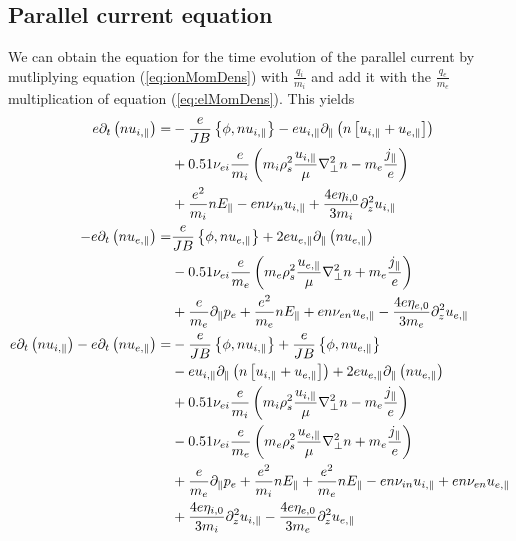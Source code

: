 \subsection{Parallel current equation}
%
We can obtain the equation for the time evolution of the parallel current by
mutliplying equation (\ref{eq:ionMomDens}) with $\frac{q_i}{m_i}$ and add it
with the $\frac{q_e}{m_e}$ multiplication of equation (\ref{eq:elMomDens}).
This yields
%
%
\begin{align*}
 e \partial_t\L( n u_{i,\|}\R)
 =&
 -\frac{e}{JB}\L\{\phi, n u_{i,\|}\R\}
 -e u_{i,\|}\partial_\|\L( n \L[u_{i,\|}+ u_{e,\|} \R]\R)
   \\&
 + 0.51 \nu_{ei}\frac{e}{m_i}\L(
   m_i \rho_s^2\frac{u_{i,\|}}{\mu} \grad_\perp^2 n
   - m_e \frac{j_\|}{e}
   \R)
   \\&
   +\frac{e^2}{m_i} n  E_\|
 - e n \nu_{i n}u_{i,\|}
 + \frac{4e\eta_{i,0}}{3m_i} \partial_z^2 u_{i,\|}
 \\
 -e \partial_t\L( n u_{e,\|}\R)
 =&
  \frac{e}{JB}\L\{\phi, n u_{e,\|}\R\}
 + 2e u_{e,\|}\partial_\|\L( n  u_{e,\|} \R)
   \\&
 - 0.51 \nu_{ei}\frac{e}{m_e}\L(
   m_e \rho_s^2\frac{u_{e,\|}}{\mu} \grad_\perp^2 n
   + m_e \frac{j_\|}{e}
   \R)
   \\&
   +\frac{e}{m_e} \partial_\| p_e
   + \frac{e^2}{m_e} n E_\|
 + en \nu_{e n}u_{e,\|}
 - \frac{4e\eta_{e,0}}{3m_e} \partial_z^2 u_{e,\|}
 \\
 e \partial_t\L( n u_{i,\|}\R)
 -e \partial_t\L( n u_{e,\|}\R)
 =&
 -\frac{e}{JB}\L\{\phi, n u_{i,\|}\R\}
 +\frac{e}{JB}\L\{\phi, n u_{e,\|}\R\}
   \\&
 -e u_{i,\|}\partial_\|\L( n \L[u_{i,\|}+ u_{e,\|} \R]\R)
 + 2e u_{e,\|}\partial_\|\L( n  u_{e,\|} \R)
   \\&
 + 0.51 \nu_{ei}\frac{e}{m_i}\L(
   m_i \rho_s^2\frac{u_{i,\|}}{\mu} \grad_\perp^2 n
   - m_e \frac{j_\|}{e}
   \R)
   \\&
 - 0.51 \nu_{ei}\frac{e}{m_e}\L(
   m_e \rho_s^2\frac{u_{e,\|}}{\mu} \grad_\perp^2 n
   + m_e \frac{j_\|}{e}
   \R)
   \\&
   +\frac{e}{m_e} \partial_\| p_e
   +\frac{e^2}{m_i} n  E_\|
   + \frac{e^2}{m_e}n E_\|
 - e n \nu_{i n}u_{i,\|}
 + en \nu_{e n}u_{e,\|}
   \\&
 + \frac{4e\eta_{i,0}}{3m_i} \partial_z^2 u_{i,\|}
 - \frac{4e\eta_{e,0}}{3m_e} \partial_z^2 u_{e,\|}
 \\

\end{align*}
